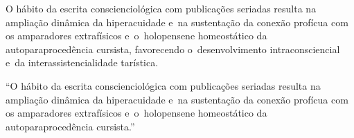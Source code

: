 \documentclass{gescons}
\begin{document}
\begin{multicols}{2}
O hábito da escrita conscienciológica com publicações seriadas resulta na ampliação dinâmica da hiperacuidade e~na sustentação da conexão profícua com os amparadores extrafísicos e~o~holopensene homeostático da autoparaprocedência cursista, favorecendo o~desenvolvimento intraconsciencial e~da interassistencialidade tarística.

\begin{pullquote}
    ``O hábito da escrita conscienciológica com publicações seriadas resulta na ampliação dinâmica da hiperacuidade e~na sustentação da conexão profícua com os amparadores extrafísicos e~o~holopensene homeostático da autoparaprocedência cursista.''
\end{pullquote}
    
    \end{multicols}
\end{document}
